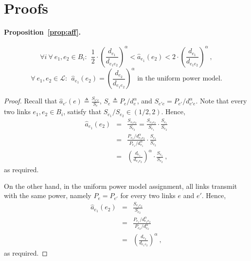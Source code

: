 \documentclass[11pt]{article}
\newenvironment{proof sketch}{\noindent {\bf Proof sketch:} }{\hfill \qed}
\newcommand{\LL}{\mathcal{L}}
\newcommand{\eqdf}{\triangleq}
\begin{document}
\begin{comment}
\begin{verbatim}

online

Different beta
close to linear powers
beta < 1

Euclidian

Integrality issues
\end{verbatim}
\end{comment}




\appendix
\section{Proofs}\label{sec:proofs}

\paragraph{Proposition~\ref{prop:aff}.}
 $$\forall i ~\forall ~e_1,e_2 \in B_i:~~  \frac 12 \cdot \left(\frac{d_{e_1}}{d_{e_1
          e_2}}\right)^\alpha < \hat a_{e_1}(e_2)  <2 \cdot \left(\frac{d_{e_1}}{d_{e_1
          e_2}}\right)^\alpha \:,$$
    $$\forall ~e_1,e_2 \in \LL:~~ \hat a_{e_1}(e_2) = \left(\frac{d_{e_2}}{d_{e_1
          e_2}}\right)^\alpha \text{ in the uniform power model.}$$

\begin{proof}
    Recall that $\hat a_{e'}(e) \eqdf \frac{S_{e'e}}{S_e}$, $S_e\eqdf P_e/d_e^\alpha$, and
    $S_{e'e}=P_{e'}/{d_{e'e}^{\alpha}}$.
    Note that every two links $e_1,e_2 \in B_i$, satisfy that $S_{e_1} / S_{e_2} \in (1/2,2)$.
    Hence,
    \begin{eqnarray*}
        \hat a_{e_1}(e_2)  & = & \frac{S_{e_1e_2}}{S_{e_2}} = \frac{S_{e_1e_2}}{S_{e_1}} \cdot
                                    \frac{S_{e_1}}{S_{e_2}}\\
                        & = & \frac {P_{e_1}/d_{e_1e_2}^{\alpha}}{P_{e_1}/d_{e_1}^{\alpha}} \cdot
                            \frac{S_{e_1}}{S_{e_2}} \\
                        & = &\left(\frac {d_{e_1}}{{d_{e_1e_2}}}\right)^{\alpha} \cdot \frac{S_{e_1}}{S_{e_2}}\:,
    \end{eqnarray*}
    as required.

    On the other hand, in the uniform power model assignment, all links transmit with the
    same power, namely $P_e = P_{e'}$ for every two links $e$ and $e'$. Hence,
    \begin{eqnarray*}
        \hat a_{e_1}(e_2)  & = & \frac{S_{e_1e_2}}{S_{e_2}} \\
                        & = & \frac {P_{e_1}/d_{e_1e_2}^{\alpha}}{P_{e_2}/d_{e_2}^{\alpha}} \\
                        & = &\left(\frac {d_{e_2}}{{d_{e_1e_2}}}\right)^{\alpha}\:,
    \end{eqnarray*}
    as required.
\end{proof}
\end{document}
